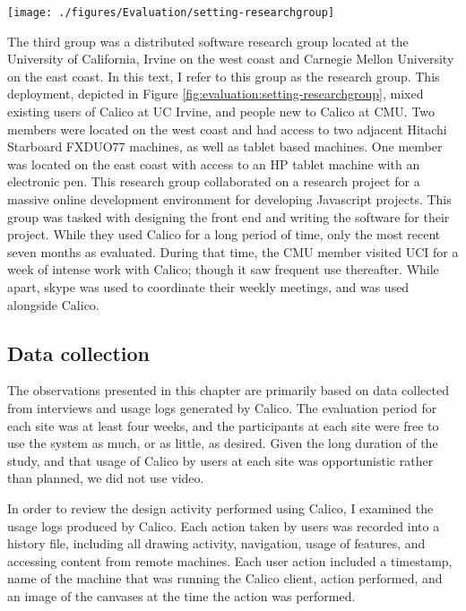 \begin{figure*}[tbh]
  \centering
  \texttt{[image: ./figures/Evaluation/setting-researchgroup]}
  \caption{The physical setup of the research group.}
  \label{fig:evaluation:setting-researchgroup}
\end{figure*}

The third group was a distributed software research group located at the University of California, Irvine on the west coast and Carnegie Mellon University on the east coast. In this text, I refer to this group as the research group. This deployment, depicted in Figure \ref{fig:evaluation:setting-researchgroup}, mixed existing users of Calico at UC Irvine, and people new to Calico at CMU. Two members were located on the west coast and had access to two adjacent Hitachi Starboard FXDUO77 machines, as well as tablet based machines. One member was located on the east coast with access to an HP tablet machine with an electronic pen. This research group collaborated on a research project for a massive online development environment for developing Javascript projects. This group was tasked with designing the front end and writing the software for their project. While they used Calico for a long period of time, only the most recent seven months as evaluated. During that time, the CMU member visited UCI for a week of intense work with Calico; though it saw frequent use thereafter. While apart, skype was used to coordinate their weekly meetings, and was used alongside Calico.

\subsection{Data collection}

The observations presented in this chapter are primarily based on data collected from interviews and usage logs generated by Calico. The evaluation period for each site was at least four weeks, and the participants at each site were free to use the system as much, or as little, as desired. Given the long duration of the study, and that usage of Calico by users at each site was opportunistic rather than planned, we did not use video.

In order to review the design activity performed using Calico, I examined the usage logs produced by Calico. Each action taken by users was recorded into a history file, including all drawing activity, navigation, usage of features, and accessing content from remote machines. Each user action included a timestamp, name of the machine that was running the Calico client, action performed, and an image of the canvases at the time the action was performed. 

